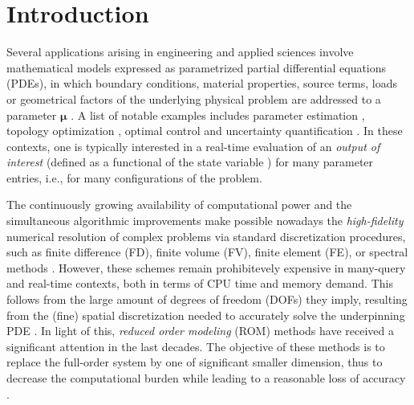 \documentclass[12pt, a4paper, twoside, openright, notitlepage]{report}
\numberwithin{equation}{chapter}
\theoremstyle{theorem}
\theoremstyle{definition}
\theoremstyle{remark}
\theoremstyle{proposition}
\numberwithin{figure}{chapter}
\newcommand{\bg}[1]{\boldsymbol{#1}}
\newcommand{\NewPage}{\newpage\null\thispagestyle{empty}\newpage}
\begin{document}
	\thispagestyle{empty}
	
	\NewPage
	
	\tableofcontents
	\listoffigures
	\listofalgorithms
	
	\NewPage
	
	
	\chapter*{Introduction}
	
		
		Several applications arising in engineering and applied sciences involve mathematical models expressed as parametrized partial differential equations (PDEs), in which boundary conditions, material properties, source terms, loads or geometrical factors of the underlying physical problem are addressed to a parameter $\bg{\mu}$ \cite{Eft08, HSR16, JIR14}. A list of notable examples includes parameter estimation \cite{Bro93}, topology optimization \cite{Ben04}, optimal control \cite{LM67} and uncertainty quantification \cite{LeM10}. In these contexts, one is typically interested in a real-time evaluation of an \emph{output of interest} (defined as a functional of the state variable \cite{Dep08}) for many parameter entries, i.e., for many configurations of the problem.  
		
		The continuously growing availability of computational power and the simultaneous algorithmic improvements make possible nowadays the \emph{high-fidelity} numerical resolution of complex problems via standard discretization procedures, such as finite difference (FD), finite volume (FV), finite element (FE), or spectral methods \cite{QMN15}. However, these schemes remain prohibitevely expensive in many-query and real-time contexts, both in terms of CPU time and memory demand. This follows from the large amount of degrees of freedom (DOFs) they imply, resulting from the (fine) spatial discretization needed to accurately solve the underpinning PDE \cite{Ams10}. In light of this, \emph{reduced order modeling} (ROM) methods have received a significant attention in the last decades. The objective of these methods is to replace the full-order system by one of significant smaller dimension, thus to decrease the computational burden while leading to a reasonable loss of accuracy \cite{Chen17}. 
		
\end{document}
